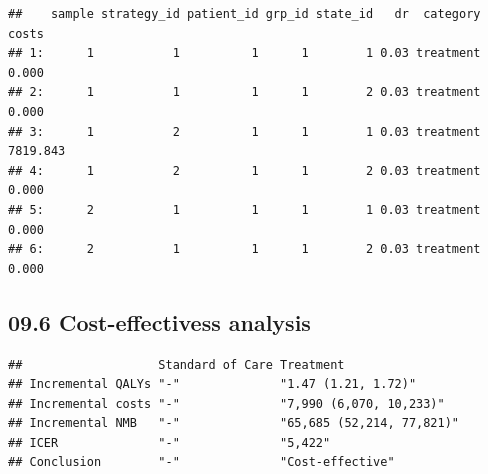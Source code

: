 \documentclass[
]{article}
\newenvironment{Shaded}{\begin{snugshade}}{\end{snugshade}}
\newcommand{\CommentTok}[1]{\textcolor[rgb]{0.56,0.35,0.01}{\textit{#1}}}
\newcommand{\DataTypeTok}[1]{\textcolor[rgb]{0.13,0.29,0.53}{#1}}
\newcommand{\DecValTok}[1]{\textcolor[rgb]{0.00,0.00,0.81}{#1}}
\newcommand{\FloatTok}[1]{\textcolor[rgb]{0.00,0.00,0.81}{#1}}
\newcommand{\KeywordTok}[1]{\textcolor[rgb]{0.13,0.29,0.53}{\textbf{#1}}}
\newcommand{\NormalTok}[1]{#1}
\newcommand{\OperatorTok}[1]{\textcolor[rgb]{0.81,0.36,0.00}{\textbf{#1}}}
\newcommand{\StringTok}[1]{\textcolor[rgb]{0.31,0.60,0.02}{#1}}
\begin{document}
\begin{Shaded}
\end{Shaded}

\begin{verbatim}
##    sample strategy_id patient_id grp_id state_id   dr  category    costs
## 1:      1           1          1      1        1 0.03 treatment    0.000
## 2:      1           1          1      1        2 0.03 treatment    0.000
## 3:      1           2          1      1        1 0.03 treatment 7819.843
## 4:      1           2          1      1        2 0.03 treatment    0.000
## 5:      2           1          1      1        1 0.03 treatment    0.000
## 6:      2           1          1      1        2 0.03 treatment    0.000
\end{verbatim}

\hypertarget{cost-effectivess-analysis}{%
\subsection{09.6 Cost-effectivess
analysis}\label{cost-effectivess-analysis}}

\begin{Shaded}
\end{Shaded}

\begin{verbatim}
##                   Standard of Care Treatment                
## Incremental QALYs "-"              "1.47 (1.21, 1.72)"      
## Incremental costs "-"              "7,990 (6,070, 10,233)"  
## Incremental NMB   "-"              "65,685 (52,214, 77,821)"
## ICER              "-"              "5,422"                  
## Conclusion        "-"              "Cost-effective"
\end{verbatim}
\end{document}
